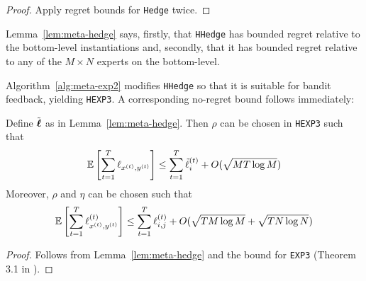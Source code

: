 \begin{proof}
	Apply regret bounds for \texttt{Hedge} twice. %
\end{proof}

Lemma~\ref{lem:meta-hedge} says, firstly, that \texttt{HHedge} has bounded regret relative to the bottom-level instantiations and, secondly, that it has bounded regret relative to any of the $M\times N$ experts on the bottom-level.


Algorithm~\ref{alg:meta-exp2} modifies \texttt{HHedge} so that it is suitable for bandit feedback, yielding \texttt{HEXP3}. A corresponding no-regret bound follows immediately:

\begin{lem}\label{lem:meta-exp}
	Define $\tilde{\boldsymbol\ell}$ as in Lemma~\ref{lem:meta-hedge}. Then $\rho$ can be chosen in \texttt{HEXP3} such that
	\begin{equation}
		\operatorname*{\mathbb E}\left[\sum_{t=1}^T\ell_{x^{(t)},y^{(t)}}\right]
		\leq \sum_{t=1}^T \tilde{\ell}^{(t)}_{i}
		+ O(\sqrt{MT\log M})
	\end{equation}
	Moreover, $\rho$ and $\eta$ can be chosen such that
	\begin{equation}
		\operatorname*{\mathbb E}\left[\sum_{t=1}^{T} \ell^{(t)}_{x^{(t)},y^{(t)}}\right]
		\leq \sum_{t=1}^T\ell^{(t)}_{i,j}
		+ O(\sqrt{TM \log M} + \sqrt{T N\log N})
	\end{equation}
\end{lem}
\begin{proof}
	Follows from Lemma~\ref{lem:meta-hedge} and the bound for \texttt{EXP3} (Theorem 3.1 in \cite{auer:02b}).
\end{proof}

